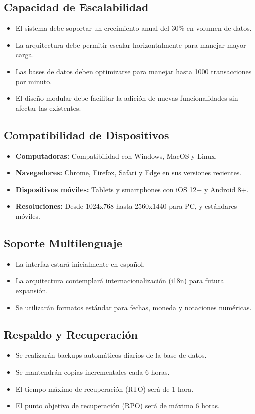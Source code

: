 \documentclass[12pt]{article}
\begin{document}
\subsection{Capacidad de Escalabilidad}
\begin{itemize}
  \item El sistema debe soportar un crecimiento anual del 30\% en volumen de datos.
  \item La arquitectura debe permitir escalar horizontalmente para manejar mayor carga.
  \item Las bases de datos deben optimizarse para manejar hasta 1000 transacciones por minuto.
  \item El diseño modular debe facilitar la adición de nuevas funcionalidades sin afectar las existentes.
\end{itemize}

\subsection{Compatibilidad de Dispositivos}
\begin{itemize}
  \item \textbf{Computadoras:} Compatibilidad con Windows, MacOS y Linux.
  \item \textbf{Navegadores:} Chrome, Firefox, Safari y Edge en sus versiones recientes.
  \item \textbf{Dispositivos móviles:} Tablets y smartphones con iOS 12+ y Android 8+.
  \item \textbf{Resoluciones:} Desde 1024x768 hasta 2560x1440 para PC, y estándares móviles.
\end{itemize}

\subsection{Soporte Multilenguaje}
\begin{itemize}
  \item La interfaz estará inicialmente en español.
  \item La arquitectura contemplará internacionalización (i18n) para futura expansión.
  \item Se utilizarán formatos estándar para fechas, moneda y notaciones numéricas.
\end{itemize}

\subsection{Respaldo y Recuperación}
\begin{itemize}
  \item Se realizarán backups automáticos diarios de la base de datos.
  \item Se mantendrán copias incrementales cada 6 horas.
  \item El tiempo máximo de recuperación (RTO) será de 1 hora.
  \item El punto objetivo de recuperación (RPO) será de máximo 6 horas.
\end{itemize}
\end{document}
